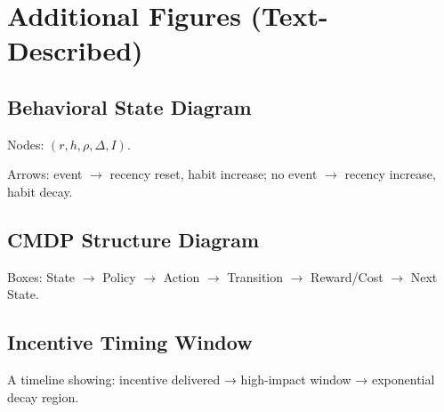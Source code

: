 
\chapter{Additional Figures (Text-Described)}

\section{Behavioral State Diagram}

Nodes:
$(r, h, \rho, \Delta, I)$.

Arrows:
event $\rightarrow$ recency reset, habit increase;  
no event $\rightarrow$ recency increase, habit decay.

\section{CMDP Structure Diagram}

Boxes:
State $\rightarrow$ Policy $\rightarrow$ Action $\rightarrow$ Transition $\rightarrow$ Reward/Cost $\rightarrow$ Next State.

\section{Incentive Timing Window}

A timeline showing:
incentive delivered → high-impact window → exponential decay region.
